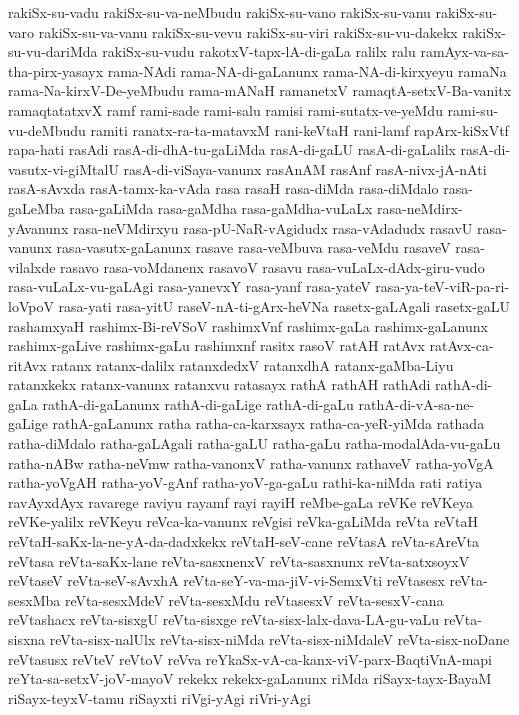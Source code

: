 {rakiSx-su-vadu
rakiSx-su-va-neMbudu
rakiSx-su-vano
rakiSx-su-vanu
rakiSx-su-varo
rakiSx-su-va-vanu
rakiSx-su-vevu
rakiSx-su-viri
rakiSx-su-vu-dakekx
rakiSx-su-vu-dariMda
rakiSx-su-vudu
rakotxV-tapx-lA-di-gaLa
ralilx
ralu
ramAyx-va-sa-tha-pirx-yasayx
rama-NAdi
rama-NA-di-gaLanunx
rama-NA-di-kirxyeyu
ramaNa
rama-Na-kirxV-De-yeMbudu
rama-mANaH
ramanetxV
ramaqtA-setxV-Ba-vanitx
ramaqtatatxvX
ramf
rami-sade
rami-salu
ramisi
rami-sutatx-ve-yeMdu
rami-su-vu-deMbudu
ramiti
ranatx-ra-ta-matavxM
rani-keVtaH
rani-lamf
rapArx-kiSxVtf
rapa-hati
rasAdi
rasA-di-dhA-tu-gaLiMda
rasA-di-gaLU
rasA-di-gaLalilx
rasA-di-vasutx-vi-giMtalU
rasA-di-viSaya-vanunx
rasAnAM
rasAnf
rasA-nivx-jA-nAti
rasA-sAvxda
rasA-tamx-ka-vAda
rasa
rasaH
rasa-diMda
rasa-diMdalo
rasa-gaLeMba
rasa-gaLiMda
rasa-gaMdha
rasa-gaMdha-vuLaLx
rasa-neMdirx-yAvanunx
rasa-neVMdirxyu
rasa-pU-NaR-vAgidudx
rasa-vAdadudx
rasavU
rasa-vanunx
rasa-vasutx-gaLanunx
rasave
rasa-veMbuva
rasa-veMdu
rasaveV
rasa-vilalxde
rasavo
rasa-voMdanenx
rasavoV
rasavu
rasa-vuLaLx-dAdx-giru-vudo
rasa-vuLaLx-vu-gaLAgi
rasa-yanevxY
rasa-yanf
rasa-yateV
rasa-ya-teV-viR-pa-ri-loVpoV
rasa-yati
rasa-yitU
raseV-nA-ti-gArx-heVNa
rasetx-gaLAgali
rasetx-gaLU
rashamxyaH
rashimx-Bi-reVSoV
rashimxVnf
rashimx-gaLa
rashimx-gaLanunx
rashimx-gaLive
rashimx-gaLu
rashimxnf
rasitx
rasoV
ratAH
ratAvx
ratAvx-ca-ritAvx
ratanx
ratanx-dalilx
ratanxdedxV
ratanxdhA
ratanx-gaMba-Liyu
ratanxkekx
ratanx-vanunx
ratanxvu
ratasayx
rathA
rathAH
rathAdi
rathA-di-gaLa
rathA-di-gaLanunx
rathA-di-gaLige
rathA-di-gaLu
rathA-di-vA-sa-ne-gaLige
rathA-gaLanunx
ratha
ratha-ca-karxsayx
ratha-ca-yeR-yiMda
rathada
ratha-diMdalo
ratha-gaLAgali
ratha-gaLU
ratha-gaLu
ratha-modalAda-vu-gaLu
ratha-nABw
ratha-neVmw
ratha-vanonxV
ratha-vanunx
rathaveV
ratha-yoVgA
ratha-yoVgAH
ratha-yoV-gAnf
ratha-yoV-ga-gaLu
rathi-ka-niMda
rati
ratiya
ravAyxdAyx
ravarege
raviyu
rayamf
rayi
rayiH
reMbe-gaLa
reVKe
reVKeya
reVKe-yalilx
reVKeyu
reVca-ka-vanunx
reVgisi
reVka-gaLiMda
reVta
reVtaH
reVtaH-saKx-la-ne-yA-da-dadxkekx
reVtaH-seV-cane
reVtasA
reVta-sAreVta
reVtasa
reVta-saKx-lane
reVta-sasxnenxV
reVta-sasxnunx
reVta-satxsoyxV
reVtaseV
reVta-seV-sAvxhA
reVta-seY-va-ma-jiV-vi-SemxVti
reVtasesx
reVta-sesxMba
reVta-sesxMdeV
reVta-sesxMdu
reVtasesxV
reVta-sesxV-cana
reVtashacx
reVta-sisxgU
reVta-sisxge
reVta-sisx-lalx-dava-LA-gu-vaLu
reVta-sisxna
reVta-sisx-nalUlx
reVta-sisx-niMda
reVta-sisx-niMdaleV
reVta-sisx-noDane
reVtasusx
reVteV
reVtoV
reVva
reYkaSx-vA-ca-kanx-viV-parx-BaqtiVnA-mapi
reYta-sa-setxV-joV-mayoV
rekekx
rekekx-gaLanunx
riMda
riSayx-tayx-BayaM
riSayx-teyxV-tamu
riSayxti
riVgi-yAgi
riVri-yAgi
}
